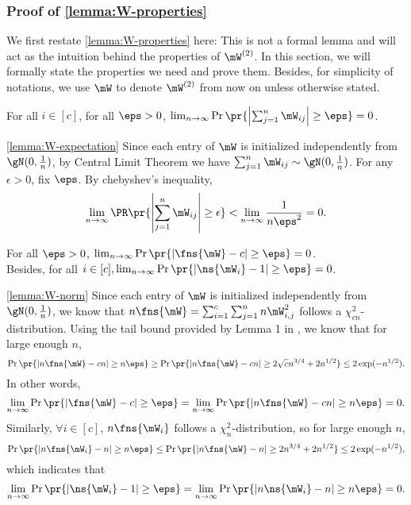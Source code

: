 
\subsubsection{Proof of \cref{lemma:W-properties}}
\label{proof-w-properties}
We first restate \cref{lemma:W-properties} here:
\lemmaWproperties*
This is not a formal lemma and will act as the intuition behind the properties of $\mW^{(2)}$. In this section, we will formally state the properties we need and prove them. Besides, for simplicity of notations, we use $\mW$ to denote $\mW^{(2)}$ from now on unless otherwise stated.

\begin{lemma}
\label{lemma:W-expectation}
 For all $i\in[c]$, for all $\eps>0$, $\lim_{n\to\infty}\Pr\pr{\left|\sum_{j=1}^n\mW_{ij}\right|\geq\eps}=0$.
\end{lemma}
\begin{proofof}{\cref{lemma:W-expectation}}
Since each entry of $\mW$ is initialized independently from $\gN(0,\frac1n)$, by Central Limit Theorem we have $\sum_{j=1}^n\mW_{ij}\sim \gN(0,\frac{1}{n})$. For any $\epsilon > 0$, fix $\eps$. By chebyshev's inequality,
\begin{equation}
    \lim_{n\to\infty}\PR\pr{\left|\sum_{j=1}^n\mW_{ij}\right|\geq\epsilon} < \lim_{n\to\infty}\frac{1}{n\eps^2} = 0. 
\end{equation}
\end{proofof}

\begin{lemma}
\label{lemma:W-norm}
For all $\eps>0$, $\lim_{n\to\infty}\Pr\pr{|\fns{\mW}-c|\geq\eps}=0$.\\Besides, for all $i\in[c], \lim_{n\to\infty}\Pr\pr{|\ns{\mW_i}-1|\geq\eps}=0$.
\end{lemma}
\begin{proofof}{\cref{lemma:W-norm}}
Since each entry of $\mW$ is initialized independently from $\gN(0,\frac1n)$, we know that $n\fns{\mW}=\sum_{i=1}^c\sum_{j=1}^nn\mW_{i,j}^2$ follows a $\chi_{cn}^2$-distribution. Using the tail bound provided by Lemma 1 in \cite{laurent2000adaptive}, we know that for large enough $n$,
\begin{equation}
\Pr\pr{|n\fns{\mW}-cn|\geq n\eps}\geq\Pr\pr{|n\fns{\mW}-cn|\geq 2\sqrt{c}n^{3/4}+2n^{1/2}}\leq 2\exp(-n^{1/2}).
\end{equation}
In other words,
\begin{equation}
\lim_{n\to\infty}\Pr\pr{|\fns{\mW}-c|\geq\eps} = \lim_{n\to\infty}\Pr\pr{|n\fns{\mW}-cn|\geq n\eps} = 0.
\end{equation}
Similarly, $\forall i\in[c]$, $n\fns{\mW_i}$ follows a $\chi_n^2$-distribution, so for large enough $n$,
\begin{equation}
\Pr\pr{|n\fns{\mW_i}-n|\geq n\eps}\leq\Pr\pr{|n\fns{\mW}-n|\geq 2n^{3/4}+2n^{1/2}}\leq 2\exp(-n^{1/2}),
\end{equation}
which indicates that
\begin{equation}
\lim_{n\to\infty}\Pr\pr{|\ns{\mW_i}-1|\geq\eps} = \lim_{n\to\infty}\Pr\pr{|n\ns{\mW_i}-n|\geq n\eps} = 0.
\end{equation}
\end{proofof}

